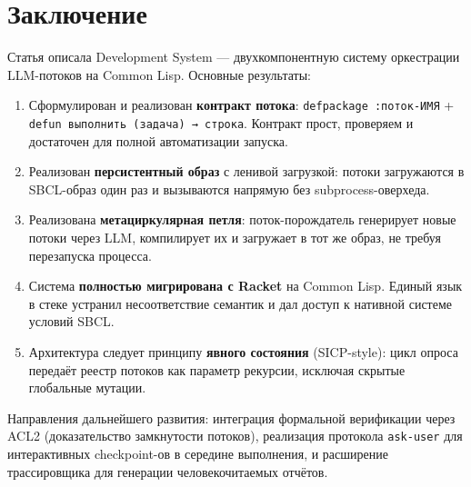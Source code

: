 \documentclass[11pt,a4paper]{article}
\begin{document}
\section{Заключение}
\label{sec:conclusion}

Статья описала Development System — двухкомпонентную систему оркестрации LLM-потоков на Common Lisp. Основные результаты:

\begin{enumerate}[noitemsep]
  \item Сформулирован и реализован \textbf{контракт потока}: \texttt{defpackage :поток-ИМЯ} + \texttt{defun выполнить (задача) → строка}. Контракт прост, проверяем и достаточен для полной автоматизации запуска.

  \item Реализован \textbf{персистентный образ} с ленивой загрузкой: потоки загружаются в SBCL-образ один раз и вызываются напрямую без subprocess-оверхеда.

  \item Реализована \textbf{метациркулярная петля}: поток-порождатель генерирует новые потоки через LLM, компилирует их и загружает в тот же образ, не требуя перезапуска процесса.

  \item Система \textbf{полностью мигрирована с Racket} на Common Lisp. Единый язык в стеке устранил несоответствие семантик и дал доступ к нативной системе условий SBCL.

  \item Архитектура следует принципу \textbf{явного состояния} (SICP-style): цикл опроса передаёт реестр потоков как параметр рекурсии, исключая скрытые глобальные мутации.
\end{enumerate}

Направления дальнейшего развития: интеграция формальной верификации через ACL2 (доказательство замкнутости потоков), реализация протокола \texttt{ask-user} для интерактивных checkpoint-ов в середине выполнения, и расширение трассировщика для генерации человекочитаемых отчётов.
\end{document}
